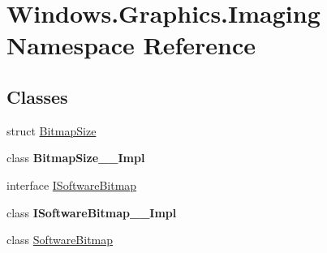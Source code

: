 \hypertarget{namespace_windows_1_1_graphics_1_1_imaging}{}\section{Windows.\+Graphics.\+Imaging Namespace Reference}
\label{namespace_windows_1_1_graphics_1_1_imaging}
\subsection*{Classes}
\begin{DoxyCompactItemize}
\item 
struct \hyperlink{struct_windows_1_1_graphics_1_1_imaging_1_1_bitmap_size}{Bitmap\+Size}
\item 
class {\bfseries Bitmap\+Size\+\_\+\+\_\+\+Impl}
\item 
interface \hyperlink{interface_windows_1_1_graphics_1_1_imaging_1_1_i_software_bitmap}{I\+Software\+Bitmap}
\item 
class {\bfseries I\+Software\+Bitmap\+\_\+\+\_\+\+Impl}
\item 
class \hyperlink{class_windows_1_1_graphics_1_1_imaging_1_1_software_bitmap}{Software\+Bitmap}
\end{DoxyCompactItemize}
